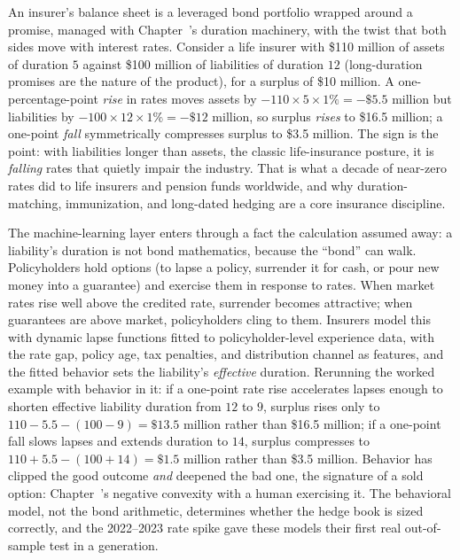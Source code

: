 \documentclass[../ai_in_finance]{subfiles}
\begin{document}
An insurer's balance sheet is a leveraged bond portfolio wrapped around a promise, managed with Chapter~'s duration machinery, with the twist that both sides move with interest rates. Consider a life insurer with \$110 million of assets of duration $5$ against \$100 million of liabilities of duration $12$ (long-duration promises are the nature of the product), for a surplus of \$10 million. A one-percentage-point \emph{rise} in rates moves assets by $-110 \times 5 \times 1\% = -\$5.5$ million but liabilities by $-100 \times 12 \times 1\% = -\$12$ million, so surplus \emph{rises} to \$16.5 million; a one-point \emph{fall} symmetrically compresses surplus to \$3.5 million. The sign is the point: with liabilities longer than assets, the classic life-insurance posture, it is \emph{falling} rates that quietly impair the industry. That is what a decade of near-zero rates did to life insurers and pension funds worldwide, and why duration-matching, immunization, and long-dated hedging are a core insurance discipline.

The machine-learning layer enters through a fact the calculation assumed away: a liability's duration is not bond mathematics, because the ``bond'' can walk. Policyholders hold options (to lapse a policy, surrender it for cash, or pour new money into a guarantee) and exercise them in response to rates. When market rates rise well above the credited rate, surrender becomes attractive; when guarantees are above market, policyholders cling to them. Insurers model this with dynamic lapse functions fitted to policyholder-level experience data, with the rate gap, policy age, tax penalties, and distribution channel as features, and the fitted behavior sets the liability's \emph{effective} duration. Rerunning the worked example with behavior in it: if a one-point rate rise accelerates lapses enough to shorten effective liability duration from $12$ to $9$, surplus rises only to $110 - 5.5 - (100 - 9) = \$13.5$ million rather than \$16.5 million; if a one-point fall slows lapses and extends duration to $14$, surplus compresses to $110 + 5.5 - (100 + 14) = \$1.5$ million rather than \$3.5 million. Behavior has clipped the good outcome \emph{and} deepened the bad one, the signature of a sold option: Chapter~'s negative convexity with a human exercising it. The behavioral model, not the bond arithmetic, determines whether the hedge book is sized correctly, and the 2022--2023 rate spike gave these models their first real out-of-sample test in a generation.
\end{document}
